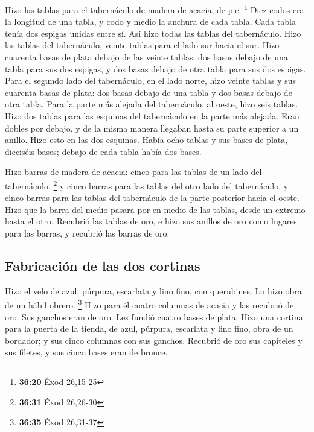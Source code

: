 \begin{paracol}{2}
 Hizo las tablas para el tabernáculo de madera de acacia,
de pie. \footnote{\textbf{36:20} Éxod 26,15-25}  Diez
codos era la longitud de una tabla, y codo y medio la anchura de cada
tabla.  Cada tabla tenía dos espigas unidas entre sí. Así
hizo todas las tablas del tabernáculo.  Hizo las tablas
del tabernáculo, veinte tablas para el lado sur hacia el sur.
 Hizo cuarenta basas de plata debajo de las veinte
tablas: dos basas debajo de una tabla para sus dos espigas, y dos basas
debajo de otra tabla para sus dos espigas.  Para el
segundo lado del tabernáculo, en el lado norte, hizo veinte tablas
 y sus cuarenta basas de plata: dos basas debajo de una
tabla y dos basas debajo de otra tabla.  Para la parte
más alejada del tabernáculo, al oeste, hizo seis tablas. 
Hizo dos tablas para las esquinas del tabernáculo en la parte más
alejada.  Eran dobles por debajo, y de la misma manera
llegaban hasta su parte superior a un anillo. Hizo esto en las dos
esquinas.  Había ocho tablas y sus bases de plata,
dieciséis bases; debajo de cada tabla había dos bases.

 Hizo barras de madera de acacia: cinco para las tablas
de un lado del tabernáculo, \footnote{\textbf{36:31} Éxod 26,26-30}
 y cinco barras para las tablas del otro lado del
tabernáculo, y cinco barras para las tablas del tabernáculo de la parte
posterior hacia el oeste.  Hizo que la barra del medio
pasara por en medio de las tablas, desde un extremo hasta el otro.
 Recubrió las tablas de oro, e hizo sus anillos de oro
como lugares para las barras, y recubrió las barras de oro.

\hypertarget{fabricaciuxf3n-de-las-dos-cortinas}{%
\subsection{Fabricación de las dos
cortinas}\label{fabricaciuxf3n-de-las-dos-cortinas}}

 Hizo el velo de azul, púrpura, escarlata y lino fino,
con querubines. Lo hizo obra de un hábil obrero. \footnote{\textbf{36:35}
  Éxod 26,31-37}  Hizo para él cuatro columnas de acacia
y las recubrió de oro. Sus ganchos eran de oro. Les fundió cuatro bases
de plata.  Hizo una cortina para la puerta de la tienda,
de azul, púrpura, escarlata y lino fino, obra de un bordador;
 y sus cinco columnas con sus ganchos. Recubrió de oro
sus capiteles y sus filetes, y sus cinco bases eran de bronce.


\end{paracol}
